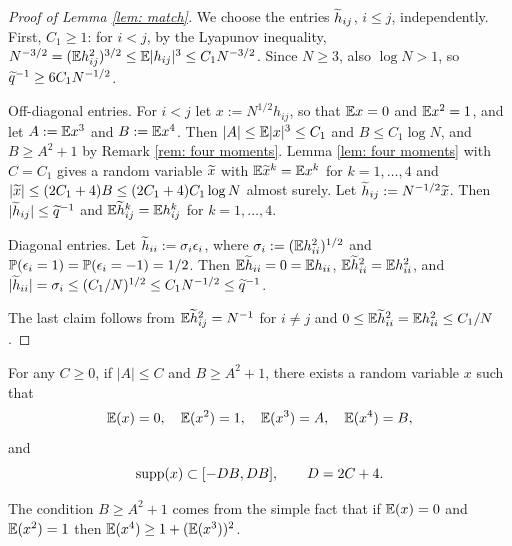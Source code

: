 \begin{proof}[Proof of Lemma \ref{lem: match}]
We choose the entries $\widetilde h_{ij}$, $i\le j$, independently. First, $C_1\ge1$: for $i<j$, by the Lyapunov inequality, $N^{-3/2}=(\mathbb{E} h_{ij}^2)^{3/2}\le\mathbb{E}|h_{ij}|^3\le C_1N^{-3/2}$. Since $N\ge3$, also $\log N>1$, so $\widetilde q^{-1}\ge6C_1N^{-1/2}$.

Off-diagonal entries. For $i<j$ let $x:=N^{1/2}h_{ij}$, so that $\mathbb{E} x=0$ and $\mathbb{E} x^2=1$, and let $A:=\mathbb{E} x^3$ and $B:=\mathbb{E} x^4$. Then $|A|\le\mathbb{E}|x|^3\le C_1$ and $B\le C_1\log N$, and $B\ge A^2+1$ by Remark \ref{rem: four moments}. Lemma \ref{lem: four moments} with $C=C_1$ gives a random variable $\widetilde x$ with $\mathbb{E}\widetilde x^k=\mathbb{E} x^k$ for $k=1,\dots,4$ and $|\widetilde x|\le(2C_1+4)B\le(2C_1+4)C_1\log N$ almost surely. Let $\widetilde h_{ij}:=N^{-1/2}\widetilde x$. Then $|\widetilde h_{ij}|\le\widetilde q^{-1}$ and $\mathbb{E}\widetilde h_{ij}^k=\mathbb{E} h_{ij}^k$ for $k=1,\dots,4$.

Diagonal entries. Let $\widetilde h_{ii}:=\sigma_i\epsilon_i$, where $\sigma_i:=(\mathbb{E} h_{ii}^2)^{1/2}$ and $\mathbb{P}(\epsilon_i=1)=\mathbb{P}(\epsilon_i=-1)=1/2$. Then $\mathbb{E}\widetilde h_{ii}=0=\mathbb{E} h_{ii}$, $\mathbb{E}\widetilde h_{ii}^2=\mathbb{E} h_{ii}^2$, and $|\widetilde h_{ii}|=\sigma_i\le(C_1/N)^{1/2}\le C_1N^{-1/2}\le\widetilde q^{-1}$.

The last claim follows from $\mathbb{E}\widetilde h_{ij}^2=N^{-1}$ for $i\ne j$ and $0\le\mathbb{E}\widetilde h_{ii}^2=\mathbb{E} h_{ii}^2\le C_1/N$.
\end{proof}

\begin{lem}\label{lem: four moments}
For any $C\ge0$, if $|A|\le C$ and $B\ge A^2+1$, there exists a random variable $x$ such that
\begin{equation}\label{tyss}
\mathbb{E}(x)=0, \quad \mathbb{E}(x^2)=1, \quad \mathbb{E}(x^3)=A, \quad \mathbb{E}(x^4)=B,
\end{equation}
and
\begin{equation}\label{tyss2}
{\rm  supp}(x) \subset [-DB, DB], \qquad D=2C+4.
\end {equation}
\end{lem}

\begin{rem}\label{rem: four moments}
The condition $B \ge A^2+1$ comes from the simple fact that if $\mathbb{E}(x)=0$ and $\mathbb{E}(x^2)=1$ then $\mathbb{E} (x^4) \ge 1+ (\mathbb{E} (x^3) )^2$.
\end{rem}

